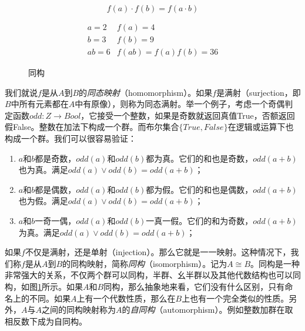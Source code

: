 \documentclass{article}
\begin{document}
\[
f(a) \cdot f(b) = f(a \cdot b)
\]

\begin{figure}[htbp]
\centering
{}
\[
\begin{array}{rl}
a = 2 & f(a) = 4 \\
b = 3 & f(b) = 9 \\
ab = 6 & f(ab) = f(a)f(b) = 36
\end{array}
\]
\caption{同构}
\label{fig:isomorphism}
\end{figure}

我们就说$f$是从$A$到$B$的{\em 同态映射}（homomorphism）。如果$f$是满射（surjection，即$B$中所有元素都在$A$中有原像），则称为同态满射。举一个例子，考虑一个奇偶判定函数$odd: Z \to Bool$，它接受一个整数，如果是奇数就返回真值True，否额返回假False。整数在加法下构成一个群。而布尔集合$\{True, False\}$在逻辑或运算下也构成一个群。我们可以很容易验证：

\begin{enumerate}
\item $a$和$b$都是奇数，$odd(a)$和$odd(b)$都为真。它们的和也是奇数，$odd(a+b)$也为真。满足$odd(a) \lor odd(b) = odd(a+b)$；
\item $a$和$b$都是偶数，$odd(a)$和$odd(b)$都为假。它们的和也是偶数，$odd(a+b)$也为假。满足$odd(a) \lor odd(b) = odd(a+b)$；
\item $a$和$b$一奇一偶，$odd(a)$和$odd(b)$一真一假。它们的和为奇数，$odd(a+b)$为真。满足$odd(a) \lor odd(b) = odd(a+b)$；
\end{enumerate}

如果$f$不仅是满射，还是单射（injection）。那么它就是一一映射。这种情况下，我们称$f$是从$A$到$B$的同构映射，简称{\em 同构}（isomorphism）。记为$A \cong B$。同构是一种非常强大的关系，不仅两个群可以同构，半群、幺半群以及其他代数结构也可以同构，如图\ref{fig:isomorphism}所示。如果$A$和$B$同构，那么抽象地来看，它们没有什么区别，只有命名上的不同。如果$A$上有一个代数性质，那么在$B$上也有一个完全类似的性质\cite{ZhangHeRui1978}。另外，$A$与$A$之间的同构映射称为$A$的{\em 自同构}（automorphism）。例如整数加群在取相反数下成为自同构。
\end{document}
